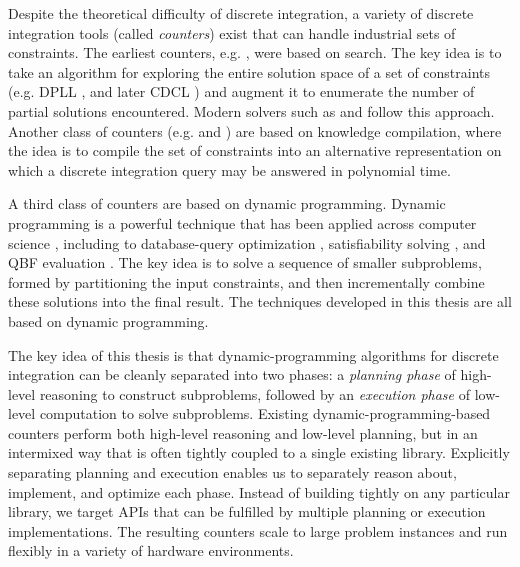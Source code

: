 Despite the theoretical difficulty of discrete integration, a variety of discrete integration tools (called \emph{counters}) exist that can handle industrial sets of constraints. The earliest counters, e.g.  \cite{birnbaum1999good}, were based on search.
The key idea is to take an algorithm for exploring the entire solution space of a set of constraints (e.g. DPLL \cite{davis1960computing,davis1962machine}, and later CDCL \cite{biere2009conflict}) and augment it to enumerate the number of partial solutions encountered. 
Modern solvers such as  \cite{SBK05} and  \cite{Thurley2006} follow this approach.
Another class of counters (e.g.  \cite{OD15} and  \cite{LM17}) are based on knowledge compilation, where the idea is to compile the set of constraints into an alternative representation on which a discrete integration query may be answered in polynomial time.

A third class of counters \cite{CW16,FHMW17,FHWZ18,FHZ19,DPV20,phan2019weighted,fichte2020exploiting} are based on dynamic programming.
Dynamic programming is a powerful technique that has been applied across computer science \cite{bellman1966dynamic}, including to database-query optimization \cite{MPPV04}, satisfiability solving \cite{uribe1994ordered,aguirre2001random,pan2005symbolic}, and QBF evaluation \cite{charwat2016bdd}.
The key idea is to solve a sequence of smaller subproblems, formed by partitioning the input constraints, and then incrementally combine these solutions into the final result.
The techniques developed in this thesis are all based on dynamic programming.

The key idea of this thesis is that dynamic-programming algorithms for discrete integration can be cleanly separated into two phases: a \emph{planning phase} of high-level reasoning to construct subproblems, followed by an \emph{execution phase} of low-level computation to solve subproblems.
Existing dynamic-programming-based counters perform both high-level reasoning and low-level planning, but in an intermixed way that is often tightly coupled to a single existing library.
Explicitly separating planning and execution enables us to separately reason about, implement, and optimize each phase.
Instead of building tightly on any particular library, we target APIs that can be fulfilled by multiple planning or execution implementations.
The resulting counters scale to large problem instances and run flexibly in a variety of hardware environments.

 
